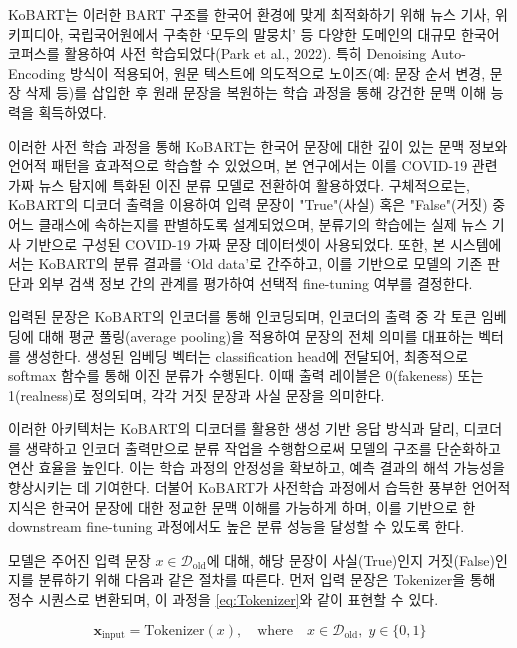 \documentclass[a4paper,fleqn]{cas-sc}
\begin{document}
KoBART는 이러한 BART 구조를 한국어 환경에 맞게 최적화하기 위해 뉴스 기사, 위키피디아, 국립국어원에서 구축한 ‘모두의 말뭉치’ 등 다양한 도메인의 대규모 한국어 코퍼스를 활용하여 사전 학습되었다(Park et al., 2022). 특히 Denoising Auto-Encoding 방식이 적용되어, 원문 텍스트에 의도적으로 노이즈(예: 문장 순서 변경, 문장 삭제 등)를 삽입한 후 원래 문장을 복원하는 학습 과정을 통해 강건한 문맥 이해 능력을 획득하였다.

이러한 사전 학습 과정을 통해 KoBART는 한국어 문장에 대한 깊이 있는 문맥 정보와 언어적 패턴을 효과적으로 학습할 수 있었으며, 본 연구에서는 이를 COVID-19 관련 가짜 뉴스 탐지에 특화된 이진 분류 모델로 전환하여 활용하였다. 구체적으로는, KoBART의 디코더 출력을 이용하여 입력 문장이 "True"(사실) 혹은 "False"(거짓) 중 어느 클래스에 속하는지를 판별하도록 설계되었으며, 분류기의 학습에는 실제 뉴스 기사 기반으로 구성된 COVID-19 가짜 문장 데이터셋이 사용되었다. 또한, 본 시스템에서는 KoBART의 분류 결과를 ‘Old data’로 간주하고, 이를 기반으로 모델의 기존 판단과 외부 검색 정보 간의 관계를 평가하여 선택적 fine-tuning 여부를 결정한다.

입력된 문장은 KoBART의 인코더를 통해 인코딩되며, 인코더의 출력 중 각 토큰 임베딩에 대해 평균 풀링(average pooling)을 적용하여 문장의 전체 의미를 대표하는 벡터를 생성한다. 생성된 임베딩 벡터는 classification head에 전달되어, 최종적으로 softmax 함수를 통해 이진 분류가 수행된다. 이때 출력 레이블은 0(fakeness) 또는 1(realness)로 정의되며, 각각 거짓 문장과 사실 문장을 의미한다.

이러한 아키텍처는 KoBART의 디코더를 활용한 생성 기반 응답 방식과 달리, 디코더를 생략하고 인코더 출력만으로 분류 작업을 수행함으로써 모델의 구조를 단순화하고 연산 효율을 높인다. 이는 학습 과정의 안정성을 확보하고, 예측 결과의 해석 가능성을 향상시키는 데 기여한다. 더불어 KoBART가 사전학습 과정에서 습득한 풍부한 언어적 지식은 한국어 문장에 대한 정교한 문맥 이해를 가능하게 하며, 이를 기반으로 한 downstream fine-tuning 과정에서도 높은 분류 성능을 달성할 수 있도록 한다.

모델은 주어진 입력 문장 \( x \in \mathcal{D}_{\text{old}} \)에 대해, 해당 문장이 사실(True)인지 거짓(False)인지를 분류하기 위해 다음과 같은 절차를 따른다.
먼저 입력 문장은 Tokenizer을 통해 정수 시퀀스로 변환되며, 이 과정을 \cref{eq:Tokenizer}와 같이 표현할 수 있다.

\begin{equation}
    \mathbf{x}_{\text{input}} = \text{Tokenizer}(x), \quad \text{where} \quad x \in \mathcal{D}_{\text{old}}, \; y \in \{0, 1\}
    \label{eq:Tokenizer}
\end{equation}
\end{document}
